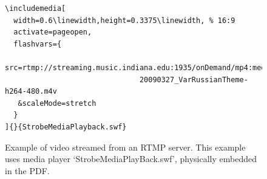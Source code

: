 \documentclass[a4paper]{article}
\begin{document}
\begin{figure}[bp]
\centering
\begin{Verbatim}
\includemedia[
  width=0.6\linewidth,height=0.3375\linewidth, % 16:9
  activate=pageopen,
  flashvars={
    src=rtmp://streaming.music.indiana.edu:1935/onDemand/mp4:media/%
                               20090327_VarRussianTheme-h264-480.m4v
   &scaleMode=stretch
  }
]{}{StrobeMediaPlayback.swf}
\end{Verbatim}
\vspace{1ex}
\caption{Example of video streamed from an RTMP server. This example uses media player `StrobeMediaPlayBack.swf', physically embedded in the PDF.}\label{videob}
\end{figure}
\end{document}
